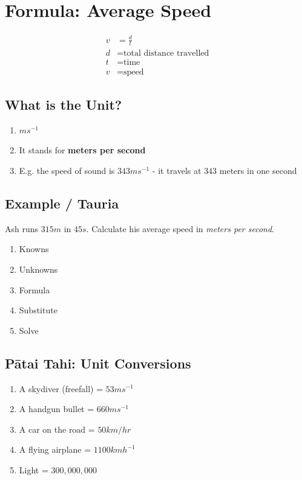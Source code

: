 \documentclass{report}
\begin{document}
\vspace{1cm}

\section{Formula: Average Speed}

\begin{align}
    v &= \frac{d}{t} \\
    d &= \text{total distance travelled} \\
    t &= \text{time} \\
    v &= \text{speed}
\end{align}

\subsection{What is the Unit?}

\begin{enumerate}
\item $ms^{-1}$
\item It stands for \textbf{meters per second}
\item E.g. the speed of sound is $343ms^{-1}$ - it travels at $343$ meters in one second
\end{enumerate}

\subsection{Example / Tauria}

Ash runs $315m$ in $45s$. Calculate his average speed in \textit{meters per second}.

\begin{enumerate}
\item Knowns
\item Unknowns
\item Formula 
\item Substitute
\item Solve
\end{enumerate}

\vspace {3cm}

\subsection{Pātai Tahi: Unit Conversions}

\begin{enumerate}
\item A skydiver (freefall) = $53ms^{-1}$
\item A handgun bullet = $660ms^{-1}$
\item A car on the road = $50km/hr$
\item A flying airplane = $1100kmh^{-1}$
\item Light = $300,000,000$
\end{enumerate}
\end{document}
